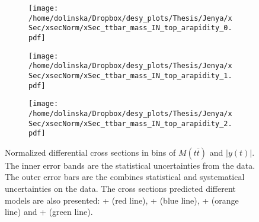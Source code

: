 \begin{figure}[p]
\centering
\begin{subfigure}
  \centering
  \texttt{[image: /home/dolinska/Dropbox/desy\_plots/Thesis/Jenya/xSec/xsecNorm/xSec\_ttbar\_mass\_IN\_top\_arapidity\_0.pdf]}
\end{subfigure}
\begin{subfigure}
  \centering
  \texttt{[image: /home/dolinska/Dropbox/desy\_plots/Thesis/Jenya/xSec/xsecNorm/xSec\_ttbar\_mass\_IN\_top\_arapidity\_1.pdf]}
\end{subfigure}
\begin{subfigure}
  \centering
  \texttt{[image: /home/dolinska/Dropbox/desy\_plots/Thesis/Jenya/xSec/xsecNorm/xSec\_ttbar\_mass\_IN\_top\_arapidity\_2.pdf]}
\end{subfigure}
\caption{Normalized differential cross sections in bins of $M(t\bar{t})$ and $|y(t)|$. The inner error bands are the statistical uncertainties from the data.
         The outer error bars are the combines statistical and systematical uncertainties on the data. The cross sections predicted different models are also presented:
         \MG + \PYTHIA (red line), \Powheg + \PYTHIA (blue line), \Powheg + \HERWIG (orange line) and \MCNLO + \HERWIG (green line).}
\label{fig:XS_2D_Mtt_yt}
\end{figure}

